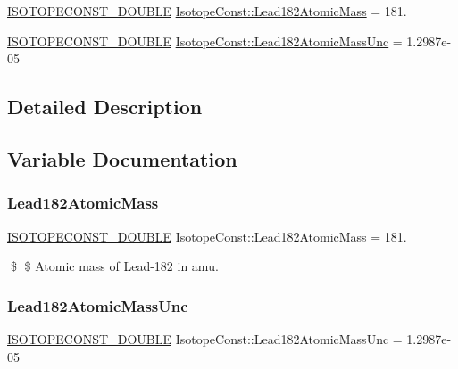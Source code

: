\begin{DoxyCompactItemize}
\item 
\mbox{\hyperlink{group___isotope_const-_macros_ga8f45a7272ce02c0b4c65c44636ed719a}{I\+S\+O\+T\+O\+P\+E\+C\+O\+N\+S\+T\+\_\+\+D\+O\+U\+B\+LE}} \mbox{\hyperlink{group___isotope_const-_lead-_pb182_gac5c9d63e9ee44b5367c4ad915365716b}{Isotope\+Const\+::\+Lead182\+Atomic\+Mass}} = 181.
\item 
\mbox{\hyperlink{group___isotope_const-_macros_ga8f45a7272ce02c0b4c65c44636ed719a}{I\+S\+O\+T\+O\+P\+E\+C\+O\+N\+S\+T\+\_\+\+D\+O\+U\+B\+LE}} \mbox{\hyperlink{group___isotope_const-_lead-_pb182_gaf8ad12489173d7f1d3dd4ad9de9e0811}{Isotope\+Const\+::\+Lead182\+Atomic\+Mass\+Unc}} = 1.\+2987e-\/05
\end{DoxyCompactItemize}


\subsection{Detailed Description}


\subsection{Variable Documentation}
\mbox{\label{group___isotope_const-_lead-_pb182_gac5c9d63e9ee44b5367c4ad915365716b}} 
\subsubsection{\texorpdfstring{Lead182\+Atomic\+Mass}{Lead182AtomicMass}}
{\footnotesize\ttfamily \mbox{\hyperlink{group___isotope_const-_macros_ga8f45a7272ce02c0b4c65c44636ed719a}{I\+S\+O\+T\+O\+P\+E\+C\+O\+N\+S\+T\+\_\+\+D\+O\+U\+B\+LE}} Isotope\+Const\+::\+Lead182\+Atomic\+Mass = 181.}

\$ \$ Atomic mass of Lead-\/182 in amu. \mbox{\label{group___isotope_const-_lead-_pb182_gaf8ad12489173d7f1d3dd4ad9de9e0811}} 
\subsubsection{\texorpdfstring{Lead182\+Atomic\+Mass\+Unc}{Lead182AtomicMassUnc}}
{\footnotesize\ttfamily \mbox{\hyperlink{group___isotope_const-_macros_ga8f45a7272ce02c0b4c65c44636ed719a}{I\+S\+O\+T\+O\+P\+E\+C\+O\+N\+S\+T\+\_\+\+D\+O\+U\+B\+LE}} Isotope\+Const\+::\+Lead182\+Atomic\+Mass\+Unc = 1.\+2987e-\/05}

